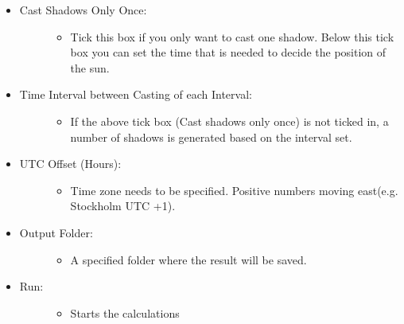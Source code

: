 \documentclass[letterpaper,10pt,english]{sphinxmanual}
\begin{document}
\begin{itemize}
\item {} \begin{description}
\item[{Cast Shadows Only Once:}] \leavevmode\begin{itemize}
\item {} 
Tick this box if you only want to cast one shadow. Below this tick box you can set the time that is needed to decide the position of the sun.

\end{itemize}

\end{description}

\item {} \begin{description}
\item[{Time Interval between Casting of each Interval:}] \leavevmode\begin{itemize}
\item {} 
If the above tick box (Cast shadows only once) is not ticked in, a number of shadows is generated based on the interval set.

\end{itemize}

\end{description}

\item {} \begin{description}
\item[{UTC Offset (Hours):}] \leavevmode\begin{itemize}
\item {} 
Time zone needs to be specified. Positive numbers moving east(e.g. Stockholm UTC +1).

\end{itemize}

\end{description}

\item {} \begin{description}
\item[{Output Folder:}] \leavevmode\begin{itemize}
\item {} 
A specified folder where the result will be saved.

\end{itemize}

\end{description}

\item {} \begin{description}
\item[{Run:}] \leavevmode\begin{itemize}
\item {} 
Starts the calculations


\end{itemize}
\end{description}
\end{itemize}
\end{document}
